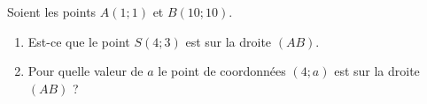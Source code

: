 
\begin{exercice}\label{exosmath-0618}

    Soient les points \( A(1;1)\) et \( B(10;10)\).

    \begin{enumerate}
        \item
            Est-ce que le point \( S(4;3)\) est sur la droite \( (AB)\).
        \item
            Pour quelle valeur de \( a\) le point de coordonnées \( (4;a)\) est sur la droite \( (AB)\) ?
    \end{enumerate}

\end{exercice}
